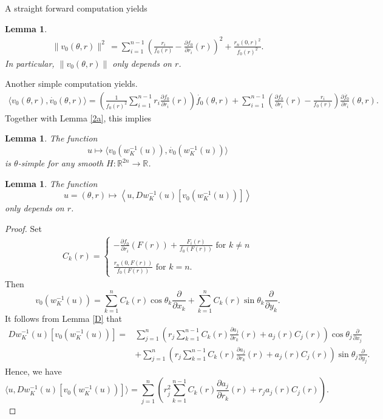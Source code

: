 \documentclass[12pt]{amsart}
\newtheorem{lemma}[theorem]{Lemma}
\theoremstyle{definition}
\newcommand{\RR}{{\mathbb R}}
\begin{document}
A straight forward computation yields 
\begin{lemma}\label{normv}
\begin{align*}
    \displaystyle\|v_0(\theta,r)\|^2 \,= \sum_{i=1}^{n-1}\left(\frac{r_i}{f_0(r)}-\frac{\partial f_0}{\partial r_i}(r) \right)^2 + \frac{r_n(0,r)^2}{f_0(r)^2}. 
\end{align*}
In particular, $\|v_0(\theta,r)\|$ only depends on $r$. 
\end{lemma}

Another simple computation yields.
\begin{align*}
    \displaystyle\langle v_0(\theta,r), \dot{v_0}(\theta,r) \rangle = \left(\frac{1}{f_0(r)^2}\sum_{i=1}^{n-1}r_i \frac{\partial f_0}{\partial r_i}(r)\right)\dot{f_0}(\theta,r) + \sum_{i=1}^{n-1}\left(\frac{\partial f_0}{\partial r_i}(r)-\frac{r_i}{f_0(r)}\right)\frac{\partial \dot{f_0}}{\partial r_i}(\theta,r).
\end{align*}
Together with Lemma \ref{2a}, this implies
\begin{lemma}\label{vdotv} The function 
    $$u \mapsto \displaystyle\langle v_0(w_K^{-1}(u)), \dot{v_0}(w_K^{-1}(u)) \rangle$$ is $\theta$-simple for any smooth $H \colon \RR^{2n}\to \RR$.
\end{lemma}

\begin{lemma}\label{Dv}
    The function $$u=(\theta,r) \mapsto \left\langle u, Dw_K^{-1}(u)\left[  v_0(w_K^{-1}(u))\right] \right\rangle$$ only depends on $r$.
\end{lemma}

\begin{proof}
Set \begin{align*}
C_k(r) =
    \begin{cases}
    \displaystyle-\frac{\partial f_0}{\partial r_i}(F(r)) + \frac{F_i(r)}{f_0(F(r))}\,\,\text{for}\,\,k \neq n\\\\
        \displaystyle \frac{r_n(0,F(r))}{f_0(F(r))} \,\,\text{for}\,\,k=n.
    \end{cases}
\end{align*}
Then $$v_0(w_K^{-1}(u)) =\sum_{k=1}^n C_k(r)\cos\theta_k \frac{\partial}{\partial x_k}+ \sum_{k=1}^n C_k(r)\sin\theta_k \frac{\partial}{\partial y_k}.$$ It follows from Lemma \ref{D} that
\begin{align*}Dw_K^{-1}(u)\left[  v_0(w_K^{-1}(u))\right] =& \sum_{j=1}^n \left( r_j\sum_{k=1}^{n-1}C_k(r)\frac{\partial a_j}{\partial r_k}(r)+ a_j(r)C_j(r) \right)\cos \theta_j \frac{\partial}{\partial x_j}\\ &+ \nonumber \sum_{j=1}^n \left( r_j\sum_{k=1}^{n-1}C_k(r)\frac{\partial a_j}{\partial r_k}(r)+ a_j(r)C_j(r) \right)\sin \theta_j \frac{\partial}{\partial y_j}.\end{align*}
Hence, we have
$$\langle u, Dw_K^{-1}(u)\left[  v_0(w_K^{-1}(u))\right] \rangle = \sum_{j=1}^n \left( r_j^2\sum_{k=1}^{n-1}C_k(r)\frac{\partial a_j}{\partial r_k}(r)+ r_j a_j(r)C_j(r) \right).$$

\end{proof}
\end{document}
